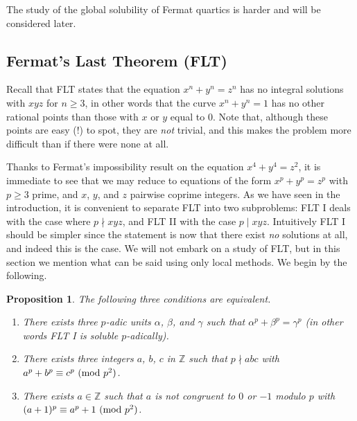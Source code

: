 \documentclass[12pt,a4paper]{article}
\newcommand{\op}{{\rm (}}
\newcommand{\cps}{\/{\rm )}}
\newcommand{\Z}{{\mathbb Z}}
\newcommand{\al}{\alpha}
\newcommand{\be}{\beta}
\newcommand{\ga}{\gamma}
\newtheorem{proposition}[theorem]{Proposition}
\renewcommand{\pmod}[1]{\allowbreak\ ({\rm{mod}}\,\,#1)}
\begin{document}
\smallskip

The study of the global solubility of Fermat quartics is harder and will
be considered later.

\subsection{Fermat's Last Theorem (FLT)}

Recall that FLT states that the equation $x^n+y^n=z^n$ has no integral
solutions with $xyz$ for $n\ge3$, in other words that the curve $x^n+y^n=1$
has no other rational points than those with $x$ or $y$ equal to $0$.
Note that, although these points are easy (!) to spot, they are \emph{not}
trivial, and this makes the problem more difficult than if there were none
at all.

\smallskip

Thanks to Fermat's impossibility result on the equation $x^4+y^4=z^2$,
it is immediate to see that we may reduce to equations of the form
$x^p+y^p=z^p$ with $p\ge3$ prime, and $x$, $y$, and $z$ pairwise coprime
integers. As we have seen in the introduction, it is convenient to separate 
FLT into two subproblems: FLT I deals with the case where $p\nmid xyz$,
and FLT II with the case $p\mid xyz$. Intuitively FLT I should be simpler
since the statement is now that there exist \emph{no} solutions at all, and
indeed this is the case. We will not embark on a study of FLT, but in this
section we mention what can be said using only local methods.
We begin by the following.

\begin{proposition} The following three conditions are equivalent.
\begin{enumerate}\item There exists three $p$-adic units $\al$, $\be$, and
$\ga$ such that $\al^p+\be^p=\ga^p$ \op in other words FLT I is soluble 
$p$-adically\cps.
\item There exists three integers $a$, $b$, $c$ in $\Z$ such that $p\nmid abc$
with $a^p+b^p\equiv c^p\pmod{p^2}$.
\item There exists $a\in\Z$ such that $a$ is not congruent to $0$ or $-1$
modulo $p$ with $(a+1)^p\equiv a^p+1\pmod{p^2}$.
\end{enumerate}\end{proposition}
\end{document}
